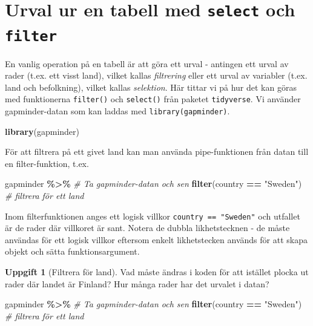 \documentclass[
]{book}
\newenvironment{Shaded}{\begin{snugshade}}{\end{snugshade}}
\newcommand{\CommentTok}[1]{\textcolor[rgb]{0.56,0.35,0.01}{\textit{#1}}}
\newcommand{\FunctionTok}[1]{\textcolor[rgb]{0.13,0.29,0.53}{\textbf{#1}}}
\newcommand{\NormalTok}[1]{#1}
\newcommand{\SpecialCharTok}[1]{\textcolor[rgb]{0.81,0.36,0.00}{\textbf{#1}}}
\newcommand{\StringTok}[1]{\textcolor[rgb]{0.31,0.60,0.02}{#1}}
\theoremstyle{definition}
\theoremstyle{definition}
\theoremstyle{definition}
\newtheorem{exercise}{Uppgift}[chapter]
\theoremstyle{definition}
\theoremstyle{remark}
\begin{document}
\section{\texorpdfstring{Urval ur en tabell med \texttt{select} och \texttt{filter}}{Urval ur en tabell med select och filter}}\label{urval-ur-en-tabell-med-select-och-filter}

En vanlig operation på en tabell är att göra ett urval - antingen ett urval av rader (t.ex. ett visst land), vilket kallas \emph{filtrering} eller ett urval av variabler (t.ex. land och befolkning), vilket kallas \emph{selektion}. Här tittar vi på hur det kan göras med funktionerna \texttt{filter()} och \texttt{select()} från paketet \texttt{tidyverse}. Vi använder gapminder-datan som kan laddas med \texttt{library(gapminder)}.

\begin{Shaded}
\begin{Highlighting}[]
\FunctionTok{library}\NormalTok{(gapminder)}
\end{Highlighting}
\end{Shaded}

För att filtrera på ett givet land kan man använda pipe-funktionen från datan till en filter-funktion, t.ex.

\begin{Shaded}
\begin{Highlighting}[]
\NormalTok{gapminder }\SpecialCharTok{\%\textgreater{}\%}                     \CommentTok{\# Ta gapminder{-}datan och sen}
  \FunctionTok{filter}\NormalTok{(country }\SpecialCharTok{==} \StringTok{"Sweden"}\NormalTok{)     }\CommentTok{\# filtrera för ett land}
\end{Highlighting}
\end{Shaded}

Inom filterfunktionen anges ett logisk villkor \texttt{country\ ==\ "Sweden"} och utfallet är de rader där villkoret är sant. Notera de dubbla likhetstecknen - de måste användas för ett logisk villkor eftersom enkelt likhetstecken används för att skapa objekt och sätta funktionsargument.

\begin{exercise}[Filtrera för land]

Vad måste ändras i koden för att istället plocka ut rader där landet är Finland? Hur många rader har det urvalet i datan?

\begin{Shaded}
\begin{Highlighting}[]
\NormalTok{gapminder }\SpecialCharTok{\%\textgreater{}\%}                     \CommentTok{\# Ta gapminder{-}datan och sen}
  \FunctionTok{filter}\NormalTok{(country }\SpecialCharTok{==} \StringTok{"Sweden"}\NormalTok{)     }\CommentTok{\# filtrera för ett land}
\end{Highlighting}
\end{Shaded}

\end{exercise}
\end{document}
